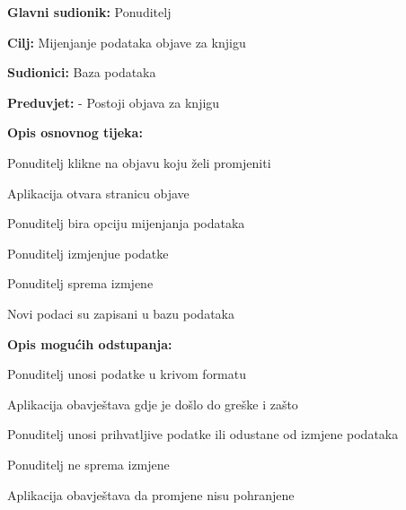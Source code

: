                     			\noindent {}
					\begin{packed_item}
	
						\item \textbf{Glavni sudionik: } Ponuditelj
						\item  \textbf{Cilj:} Mijenjanje podataka objave za knjigu
						\item  \textbf{Sudionici:} Baza podataka
						\item  \textbf{Preduvjet:} - Postoji objava za knjigu
						\item  \textbf{Opis osnovnog tijeka:}
						
						\item[] \begin{packed_enum}
	
							\item Ponuditelj klikne na objavu koju želi promjeniti
                            				\item Aplikacija otvara stranicu objave
							\item Ponuditelj bira opciju mijenjanja podataka
	                            			\item Ponuditelj izmjenjue podatke
                            				\item Ponuditelj sprema izmjene
                            				\item Novi podaci su zapisani u bazu podataka
						\end{packed_enum}
						
						\item  \textbf{Opis mogućih odstupanja:}
						
						\item[] \begin{packed_item}
	
							\item[2.a] Ponuditelj unosi podatke u krivom formatu
							\item[] \begin{packed_enum}
								
								\item Aplikacija obavještava gdje je došlo do greške i zašto
								\item Ponuditelj unosi prihvatljive podatke ili odustane od izmjene podataka
								
							\end{packed_enum}

                           				\item[2.b] Ponuditelj ne sprema izmjene
                            				\item[] \begin{packed_enum}

                                				\item Aplikacija obavještava da promjene nisu pohranjene
                            				\end{packed_enum}
						\end{packed_item}
					\end{packed_item}

